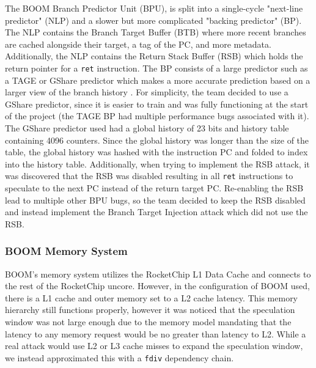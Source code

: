 The BOOM Branch Predictor Unit (BPU), is split into a single-cycle "next-line predictor" (NLP) and a
slower but more complicated "backing predictor" (BP). The NLP contains the Branch Target Buffer (BTB) 
where more recent branches are cached alongside their target, a tag of the PC, and more metadata. Additionally,
the NLP contains the Return Stack Buffer (RSB) which holds the return pointer for a {\tt ret} instruction. The BP
consists of a large predictor such as a TAGE or GShare predictor which makes a more accurate prediction based on
a larger view of the branch history \cite{b47}. For simplicity, the team decided to use a GShare predictor, since it is 
easier to train and was fully functioning at the start of the project (the TAGE BP had multiple performance bugs
associated with it). The GShare predictor used had a global history of 23 bits and history table containing
4096 counters. Since the global history was longer than the size of the table, the global history was hashed with
the instruction PC and folded to index into the history table. Additionally, when trying to
implement the RSB attack, it was discovered that the RSB was disabled resulting in all {\tt ret} instructions
to speculate to the next PC instead of the return target PC. Re-enabling the RSB lead to multiple other BPU bugs,
so the team decided to keep the RSB disabled and instead implement the Branch Target Injection attack which did not
use the RSB.

\subsubsection{BOOM Memory System}


BOOM's memory system utilizes the RocketChip L1 Data Cache and connects to the rest of the RocketChip
uncore. However, in the configuration of BOOM used, there is a L1 cache and outer memory set to a L2 cache
latency. This memory hierarchy still functions properly, however it was noticed that the speculation window
was not large enough due to the memory model mandating that the latency to any memory request would be no greater than latency to L2. %
While a real attack would use L2 or L3 cache misses to expand the speculation window, we instead approximated this with a {\tt fdiv} dependency chain.

